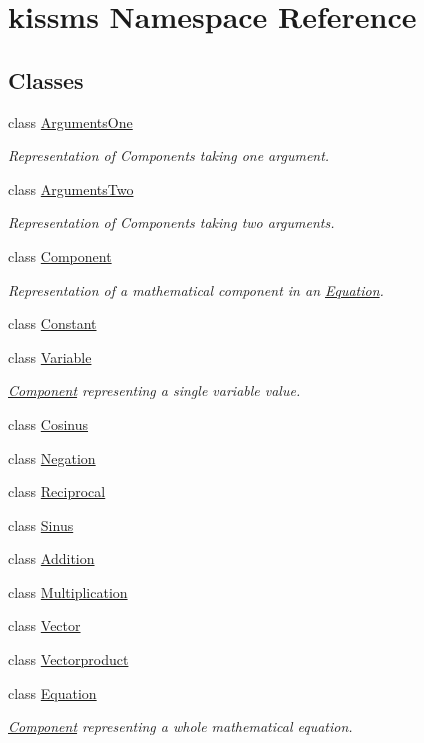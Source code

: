 \hypertarget{namespacekissms}{\section{kissms Namespace Reference}
\label{namespacekissms}
}
\subsection*{Classes}
\begin{DoxyCompactItemize}
\item 
class \hyperlink{classkissms_1_1_arguments_one}{Arguments\-One}
\begin{DoxyCompactList}\small\item\em Representation of Components taking one argument. \end{DoxyCompactList}\item 
class \hyperlink{classkissms_1_1_arguments_two}{Arguments\-Two}
\begin{DoxyCompactList}\small\item\em Representation of Components taking two arguments. \end{DoxyCompactList}\item 
class \hyperlink{classkissms_1_1_component}{Component}
\begin{DoxyCompactList}\small\item\em Representation of a mathematical component in an \hyperlink{classkissms_1_1_equation}{Equation}. \end{DoxyCompactList}\item 
class \hyperlink{classkissms_1_1_constant}{Constant}
\item 
class \hyperlink{classkissms_1_1_variable}{Variable}
\begin{DoxyCompactList}\small\item\em \hyperlink{classkissms_1_1_component}{Component} representing a single variable value. \end{DoxyCompactList}\item 
class \hyperlink{classkissms_1_1_cosinus}{Cosinus}
\item 
class \hyperlink{classkissms_1_1_negation}{Negation}
\item 
class \hyperlink{classkissms_1_1_reciprocal}{Reciprocal}
\item 
class \hyperlink{classkissms_1_1_sinus}{Sinus}
\item 
class \hyperlink{classkissms_1_1_addition}{Addition}
\item 
class \hyperlink{classkissms_1_1_multiplication}{Multiplication}
\item 
class \hyperlink{classkissms_1_1_vector}{Vector}
\item 
class \hyperlink{classkissms_1_1_vectorproduct}{Vectorproduct}
\item 
class \hyperlink{classkissms_1_1_equation}{Equation}
\begin{DoxyCompactList}\small\item\em \hyperlink{classkissms_1_1_component}{Component} representing a whole mathematical equation. \end{DoxyCompactList}\end{DoxyCompactItemize}

